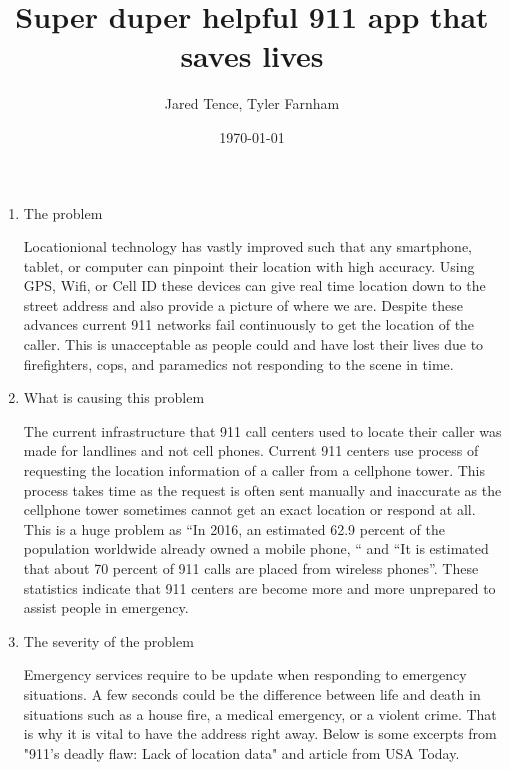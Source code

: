 \documentclass[12pt]{article}
\title{Super duper helpful 911 app that saves lives}
\author{Jared Tence, Tyler Farnham}
\date{\today}
\begin{document}
\maketitle

\begin{enumerate}
\item The problem

Locationional technology has vastly improved such that any smartphone, tablet, or computer can pinpoint their location with high accuracy. Using GPS, Wifi, or Cell ID these devices can give real time location down to the street address and also provide a picture of where we are. Despite these advances current 911 networks fail continuously to get the location of the caller. This is unacceptable as people could and have lost their lives due to firefighters, cops, and paramedics not responding to the scene in time.


\item What is causing this problem

The current infrastructure that 911 call centers used to locate their caller was made for landlines and not cell phones. Current 911 centers use process of requesting the location information of a caller from a cellphone tower. This process takes time as the request is often sent manually and inaccurate as the cellphone tower sometimes cannot get an exact location or respond at all. This is a huge problem as “In 2016, an estimated 62.9 percent of the population worldwide already owned a mobile phone, “ and “It is estimated that about 70 percent of 911 calls are placed from wireless phones”. These statistics indicate that 911 centers are become more and more unprepared to assist people in emergency.


\item The severity of the problem

Emergency services require to be update when responding to emergency situations. A few seconds could be the difference between life and death in situations such as a house fire, a medical emergency, or a violent crime. That is why it is vital to have the address right away. Below is some excerpts from "911's deadly flaw: Lack of location data" and article from USA Today. \cite{DF}


\end{enumerate}
\end{document}
